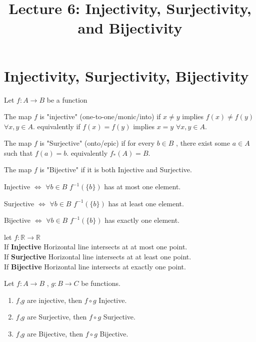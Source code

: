 \documentclass[a4paper,english,12pt]{article}   	%
\title{Lecture 6: Injectivity, Surjectivity, and Bijectivity}
\author{}
\begin{document}
\maketitle

\section {Injectivity, Surjectivity, Bijectivity}
Let $ f \colon A \to B $ be a function
\begin{defn} [Injectivity] The map $f$ is "injective" (one-to-one/monic/into) if $x \neq y $ implies $f(x) \neq f(y) $  $\forall x,y \in A$.
equivalently if $f(x) = f(y) $ implies $x = y $ $\forall x,y \in A$.
\end{defn}
\begin{defn} [Surjectivity] The map $f$ is "Surjective" (onto/epic) if for every $b \in B$ , there exist some $a \in A $ such that $f(a)=b$. equivalently $f_{*}(A)=B$.
\end{defn}
\begin{defn} [Bijectivity] The map $f$ is "Bijective" if it is both Injective and Surjective.
\end{defn}
\begin{rem}
Injective $\Leftrightarrow$  $\forall b \in B$ $ f^{-1}(\{b\})$ has at most one element.
\end{rem}
\begin{rem}
Surjective $\Leftrightarrow$  $\forall b \in B$ $ f^{-1}(\{b\})$ has at least one element.
\end{rem}
\begin{rem}
Bijective $\Leftrightarrow$  $\forall b \in B$ $ f^{-1}(\{b\})$ has exactly one element.
\end{rem}
\begin{exmp}
let $f \colon \mathbb{R} \to \mathbb{R}$ \\
If \textbf{Injective} Horizontal line intersects at at most one point.\\
If \textbf{Surjective} Horizontal line intersects at at least one point.\\
If \textbf{Bijective} Horizontal line intersects at exactly one point.\\
\end{exmp}
\begin{lem}
Let $f \colon A \to B$ , $g \colon B \to C$ be functions.
\begin{enumerate}
\item  $f$,$g$ are injective, then $f \circ g$ Injective.
\item  $f$,$g$ are Surjective, then $f \circ g$ Surjective.
\item  $f$,$g$ are Bijective, then $f \circ g$ Bijective.
\end{enumerate}
\end{lem}
\end{document}
